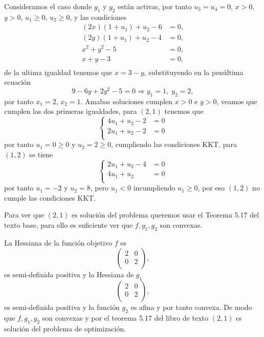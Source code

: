Consideramos el caso donde $g_1$ y $g_2$ están activas, por tanto $u_3 = u_4 = 0$, $x > 0$, $y > 0$, $u_1 \geq 0$, $u_2 \geq 0$,
y las condiciones
\begin{equation*}
\begin{aligned}
    (2x) (1 + u_1) + u_2 - 6 & = 0, \\
    (2y) (1 + u_1) + u_2 - 4 & = 0, \\
    x^2 + y^2 - 5 & = 0, \\
    x + y - 3 & = 0, \\
\end{aligned}
\end{equation*}
de la ultima igualdad tenemos que $x = 3 - y$,
substituyendo en la penúltima ecuación
\begin{equation*}
    9 - 6 y + 2 y^2 - 5 = 0 \Rightarrow y_1 = 1, \; y_2 = 2,
\end{equation*}
por tanto $x_1 = 2$, $x_2 = 1$.
Amabas soluciones cumplen $x > 0$ e $y > 0$,
veamos que cumplen las dos primeras igualdades,
para $(2, 1)$ tenemos que
\begin{equation*}
    \left\{
    \begin{aligned}
        4 u_1 + u_2 - 2 & = 0 \\
        2 u_1 + u_2 - 2 & = 0 \\
    \end{aligned}
    \right.
\end{equation*}
por tanto $u_1 = 0 \geq 0$ y $u_2 = 2 \geq 0$,
cumpliendo las condiciones KKT,
para $(1, 2)$ se tiene
\begin{equation*}
    \left\{
    \begin{aligned}
        2 u_1 + u_2 - 4 & = 0 \\
        4 u_1 + u_2 & = 0 \\
    \end{aligned}
    \right.
\end{equation*}
por tanto $u_1 = - 2$ y $u_2 = 8$, pero $u_1 < 0$ incumpliendo $u_1 \geq 0$,
por eso $(1, 2)$ no cumple las condiciones KKT.

Para ver que $(2, 1)$ es solución del problema queremos usar el Teorema 5.17 del texto base,
para ello es suficiente ver que $f, g_1, g_2$ son convexas.

La Hessiana de la función objetivo $f$ es
\begin{equation*}
\begin{pmatrix}
    2 & 0 \\
    0 & 2 \\
\end{pmatrix},
\end{equation*}
es semi-definida positiva y la Hessiana de $g_1$
\begin{equation*}
\begin{pmatrix}
    2 & 0 \\
    0 & 2 \\
\end{pmatrix},
\end{equation*}
es semi-definida positiva y la función $g_2$ es afina y por tanto convexa.
De modo que $f, g_1, g_2$ son convexas y por el teorema 5.17 del libro de texto $(2, 1)$ es solución del problema de optimización.


